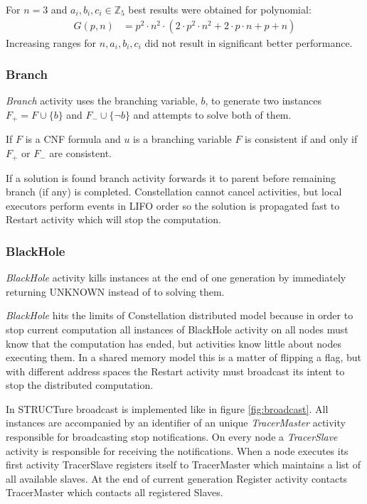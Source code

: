For $n = 3$ and $a_i, b_i, c_i \in \mathbb{Z}_5$ best results were
obtained for polynomial:
\begin{align}
  G(p, n) &=  p^2 \cdot n^2 \cdot (2 \cdot p^2 \cdot n^2 + 2 \cdot p \cdot n + p + n)
\end{align}
Increasing ranges for $n, a_i, b_i, c_i$ did not result in
significant better performance.


\subsubsection{Branch}

\emph{Branch} activity uses the branching variable, $b$, to generate
two instances $F_+ = F \cup \{b\}$ and $F_- \cup \{\neg b\}$ and attempts
to solve both of them.

\begin{myprop}
  If $F$ is a CNF formula and $u$ is a branching variable
  $F$ is consistent if and only if $F_+$ or $F_-$ are consistent.
\end{myprop}

If a solution is found branch activity forwards it to parent before
remaining branch (if any) is completed. Constellation cannot cancel
activities, but local executors perform events in LIFO order so
the solution is propagated fast to Restart activity which will stop
the computation.


\subsubsection{BlackHole}
\label{sssec:blackhole}

\emph{BlackHole} activity kills instances at the end of one
generation by immediately returning \textsf{UNKNOWN} instead of to
solving them.

\emph{BlackHole} hits the limits of Constellation distributed
model because in order to stop current computation all instances of
BlackHole activity on all nodes must know that the computation has
ended, but activities know little about nodes executing them. In
a shared memory model this is a matter of flipping a flag, but with
different address spaces the Restart activity must broadcast its
intent to stop the distributed computation.

In STRUCTure broadcast is implemented like in figure
\ref{fig:broadcast}.  All instances are accompanied by an
identifier of an unique \emph{TracerMaster} activity responsible for
broadcasting stop notifications. On every node a \emph{TracerSlave}
activity is responsible for receiving the notifications. When a
node executes its first activity TracerSlave registers itself to
TracerMaster which maintains a list of all available slaves. At the
end of current generation Register activity contacts TracerMaster
which contacts all registered Slaves.

